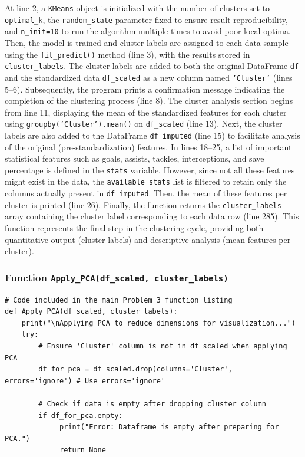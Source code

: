 \documentclass[12pt]{report}
\begin{document}
{{{\begin{lstlisting}
\end{lstlisting}
At line 2, a \texttt{KMeans} object is initialized with the number of clusters set to \texttt{optimal\_k}, the \texttt{random\_state} parameter fixed to ensure result reproducibility, and \texttt{n\_init=10} to run the algorithm multiple times to avoid poor local optima. Then, the model is trained and cluster labels are assigned to each data sample using the \texttt{fit\_predict()} method (line 3), with the results stored in \texttt{cluster\_labels}. The cluster labels are added to both the original DataFrame \texttt{df} and the standardized data \texttt{df\_scaled} as a new column named \texttt{'Cluster'} (lines 5–6). Subsequently, the program prints a confirmation message indicating the completion of the clustering process (line 8). The cluster analysis section begins from line 11, displaying the mean of the standardized features for each cluster using \texttt{groupby('Cluster').mean()} on \texttt{df\_scaled} (line 13). Next, the cluster labels are also added to the DataFrame \texttt{df\_imputed} (line 15) to facilitate analysis of the original (pre-standardization) features. In lines 18–25, a list of important statistical features such as goals, assists, tackles, interceptions, and save percentage is defined in the \texttt{stats} variable. However, since not all these features might exist in the data, the \texttt{available\_stats} list is filtered to retain only the columns actually present in \texttt{df\_imputed}. Then, the mean of these features per cluster is printed (line 26). Finally, the function returns the \texttt{cluster\_labels} array containing the cluster label corresponding to each data row (line 285). This function represents the final step in the clustering cycle, providing both quantitative output (cluster labels) and descriptive analysis (mean features per cluster).
\subsubsection{Function \texttt{Apply\_PCA(df\_scaled, cluster\_labels)}} %
\begin{lstlisting}
# Code included in the main Problem_3 function listing
def Apply_PCA(df_scaled, cluster_labels):
    print("\nApplying PCA to reduce dimensions for visualization...")
    try:
        # Ensure 'Cluster' column is not in df_scaled when applying PCA
        df_for_pca = df_scaled.drop(columns='Cluster', errors='ignore') # Use errors='ignore'

        # Check if data is empty after dropping cluster column
        if df_for_pca.empty:
             print("Error: Dataframe is empty after preparing for PCA.")
             return None


\end{lstlisting}}}}
\end{document}
